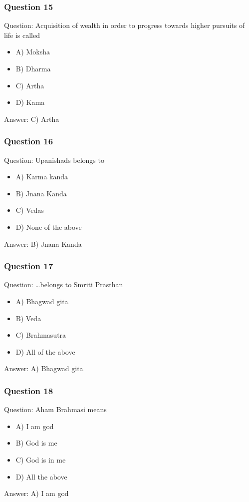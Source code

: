 \begin{frame}[fragile]\frametitle{Question 15}
Question: Acquisition of wealth in order to progress towards higher pursuits of life is called
\begin{itemize}
\item A) Moksha
\item B) Dharma
\item C) Artha
\item D) Kama
\end{itemize}
Answer: C) Artha
\end{frame}


\begin{frame}[fragile]\frametitle{Question 16}
Question: Upanishads belongs to
\begin{itemize}
\item A) Karma kanda
\item B) Jnana Kanda
\item C) Vedas
\item D) None of the above
\end{itemize}
Answer: B) Jnana Kanda
\end{frame}

\begin{frame}[fragile]\frametitle{Question 17}
Question: \ldots belongs to Smriti Prasthan
\begin{itemize}
\item A) Bhagwad gita
\item B) Veda
\item C) Brahmasutra
\item D) All of the above
\end{itemize}
Answer: A) Bhagwad gita
\end{frame}

\begin{frame}[fragile]\frametitle{Question 18}
Question: Aham Brahmasi means
\begin{itemize}
\item A) I am god
\item B) God is me
\item C) God is in me
\item D) All the above
\end{itemize}
Answer: A) I am god
\end{frame}

